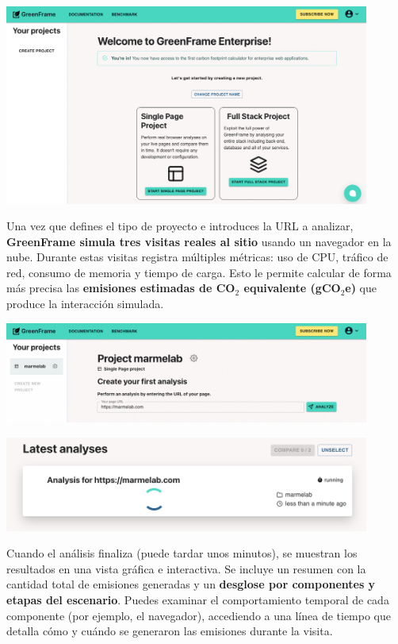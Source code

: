 \documentclass[12pt,a4paper]{report}
\begin{document}
\begin{center}
  \includegraphics[width=0.9\textwidth]{imagenes/Greenframe_2.png}
\end{center}

Una vez que defines el tipo de proyecto e introduces la URL a analizar,
\textbf{GreenFrame simula tres visitas reales al sitio} usando un navegador en
la nube. Durante estas visitas registra múltiples métricas: uso de CPU, tráfico
de red, consumo de memoria y tiempo de carga. Esto le permite calcular de forma
más precisa las \textbf{emisiones estimadas de CO$_2$ equivalente (gCO$_2$e)}
que produce la interacción simulada.

\begin{center}
  \includegraphics[width=0.9\textwidth]{imagenes/Greenframe_3.png}
\end{center}

\begin{center}
  \includegraphics[width=0.9\textwidth]{imagenes/Greenframe_4.png}
\end{center}

Cuando el análisis finaliza (puede tardar unos minutos), se muestran los
resultados en una vista gráfica e interactiva. Se incluye un resumen con la
cantidad total de emisiones generadas y un \textbf{desglose por componentes y
  etapas del escenario}. Puedes examinar el comportamiento temporal de cada
componente (por ejemplo, el navegador), accediendo a una línea de tiempo que
detalla cómo y cuándo se generaron las emisiones durante la visita.
\end{document}
